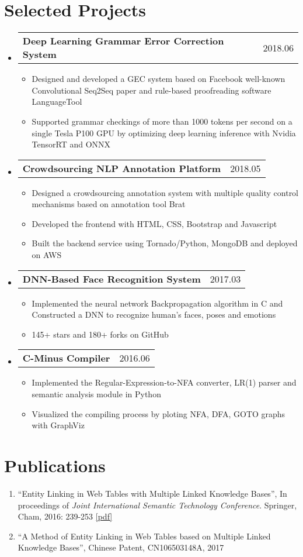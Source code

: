\documentclass[letterpaper, 11pt]{article}
\makeatletter
\newcommand{\resumeSingleSubItem}[1]{
   \item\small{#1} \vspace{-3pt}
}
\newcommand{\projectSubheading}[2]{
  \vspace{-2pt}\item
    \begin{tabular*}{0.97\textwidth}[t]{l@{\extracolsep{\fill}}r}
      \textbf{#1} & #2 \\
    \end{tabular*}\vspace{-7pt}
}
\newcommand{\resumeSubHeadingListStart}{\begin{itemize}[leftmargin=*]}
\newcommand{\resumeSubHeadingListEnd}{\end{itemize}\vspace{-9.6pt}}
\newcommand{\resumeItemListStart}{\begin{itemize}[leftmargin=*]}
\newcommand{\resumeItemListEnd}{\end{itemize}\vspace{-5pt}}
\makeatother
\begin{document}
\section{Selected Projects}
    \resumeSubHeadingListStart
        \projectSubheading{Deep Learning Grammar Error Correction System}{2018.06}
          \resumeItemListStart
            \resumeSingleSubItem{Designed and developed a GEC system based on Facebook well-known Convolutional Seq2Seq paper and rule-based proofreading software LanguageTool}
            \resumeSingleSubItem{Supported grammar checkings of more than 1000 tokens per second on a single Tesla P100 GPU by optimizing deep learning inference with Nvidia TensorRT and ONNX}
          \resumeItemListEnd
            
        \projectSubheading{Crowdsourcing NLP Annotation Platform}{2018.05}
          \resumeItemListStart
            \resumeSingleSubItem{Designed a crowdsourcing annotation system with multiple quality control mechanisms based on annotation tool Brat}
            \resumeSingleSubItem{Developed the frontend with HTML, CSS, Bootstrap and Javascript}
            \resumeSingleSubItem{Built the backend service using Tornado/Python, MongoDB and deployed on AWS}
          \resumeItemListEnd

        \projectSubheading{DNN-Based Face Recognition System}{2017.03}
          \resumeItemListStart
            \resumeSingleSubItem{Implemented the neural network Backpropagation algorithm in C and Constructed a DNN to recognize human's faces, poses and emotions}
            \resumeSingleSubItem{145+ stars and 180+ forks on GitHub}
          \resumeItemListEnd

        \projectSubheading{C-Minus Compiler}{2016.06}
          \resumeItemListStart
            \resumeSingleSubItem{Implemented the Regular-Expression-to-NFA converter, LR(1) parser and semantic analysis module in Python}
            \resumeSingleSubItem{Visualized the compiling process by ploting NFA, DFA, GOTO graphs with GraphViz}
          \resumeItemListEnd

    \resumeSubHeadingListEnd


\section{Publications}
    \begin{enumerate}[leftmargin=*, itemsep=0pt]
        \resumeSingleSubItem{``Entity Linking in Web Tables with Multiple Linked Knowledge Bases'', In proceedings of \textit{Joint International Semantic Technology Conference}. Springer, Cham, 2016: 239-253 \href{https://link.springer.com/chapter/10.1007/978-3-319-50112-3_18}{[pdf]}}
        \resumeSingleSubItem{``A Method of Entity Linking in Web Tables based on Multiple Linked Knowledge Bases'', Chinese Patent, CN106503148A, 2017} 
    \end{enumerate}\vspace{-10pt}
\end{document}
